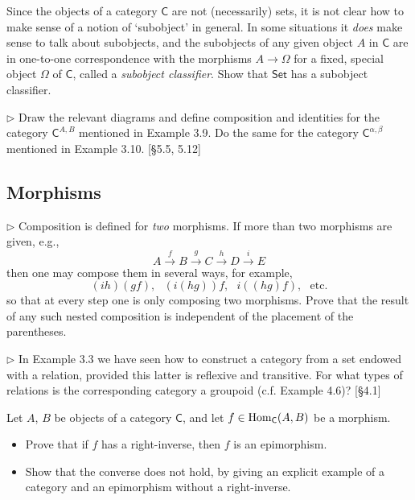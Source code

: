 \begin{problem}
  \def \C {\mathsf{C}}
  \def \Set {\mathsf{Set}}

  Since the objects of a category $\C$ are not (necessarily) sets, it is not
  clear how to make sense of a notion of `subobject' in general. In some
  situations it \textit{does} make sense to talk about subobjects, and the
  subobjects of any given object $A$ in $\C$ are in one-to-one correspondence
  with the morphisms $A\to\Omega$ for a fixed, special object $\Omega$ of
  $\C$, called a \textit{subobject classifier}. Show that $\Set$ has
  a subobject classifier.
\end{problem}

\begin{problem}
  \def \C {\mathsf{C}}

  $\rhd$ Draw the relevant diagrams and define composition and identities for
  the category $\C^{A,B}$ mentioned in Example 3.9. Do the same for the
  category $\C^{\alpha,\beta}$ mentioned in Example 3.10. [\S5.5, 5.12]
\end{problem}

\subsection{Morphisms}


\begin{problem}
  $\rhd$ Composition is defined for \textit{two} morphisms. If more than two
  morphisms are given, e.g.,
  \[ A \xrightarrow{f} B \xrightarrow{g} C \xrightarrow{h} D \xrightarrow{i} E \]
  then one may compose them in several ways, for example,
  \[ (ih)(gf),\,\,\,\,(i(hg))f,\,\,\,\,i((hg)f),\,\,\,\,\text{etc.}\]
  so that at every step one is only composing two morphisms. Prove that the
  result of any such nested composition is independent of the placement of
  the parentheses.
\end{problem}

\begin{problem}
  $\rhd$ In Example 3.3 we have seen how to construct a category from a set
  endowed with a relation, provided this latter is reflexive and transitive.
  For what types of relations is the corresponding category a groupoid (c.f.
  Example 4.6)? [\S 4.1]
\end{problem}

\begin{problem}
  \def \C {\mathsf{C}}
  Let $A$, $B$ be objects of a category $\C$, and let $f \in \Hom_\C(A, B)$
  be a morphism.
  \begin{itemize}
    \item Prove that if $f$ has a right-inverse, then $f$ is an epimorphism.
    \item Show that the converse does not hold, by giving an explicit example
    of a category and an epimorphism without a right-inverse.
  \end{itemize}
\end{problem}

